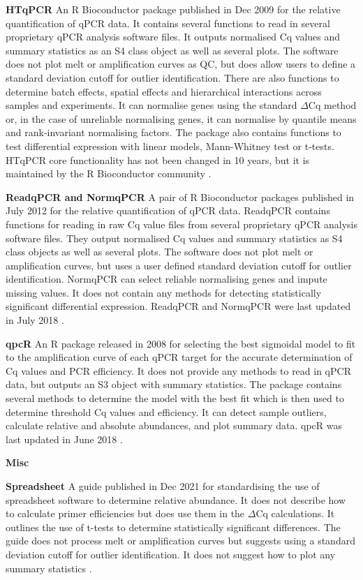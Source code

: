 \documentclass[../main.tex]{subfiles}
\begin{document}
\textbf{HTqPCR} An R Bioconductor package published in Dec 2009 for the relative quantification of qPCR data. 
It contains several functions to read in several proprietary qPCR analysis software files. 
It outputs normalised Cq values and summary statistics as an S4 class object as well as several plots. 
The software does not plot melt or amplification curves as QC, but does allow users to define a standard deviation cutoff for outlier identification. 
There are also functions to determine batch effects, spatial effects and hierarchical interactions across samples and experiments. 
It can normalise genes using the standard $\Delta$Cq method or, in the case of unreliable normalising genes, it can normalise by quantile means and rank-invariant normalising factors. 
The package also contains functions to test differential expression with linear models, Mann-Whitney test or t-tests. 
HTqPCR core functionality has not been changed in 10 years, but it is maintained by the R Bioconductor community \parencite{Dvinge2009}.

\textbf{ReadqPCR and NormqPCR} A pair of R Bioconductor packages published in July 2012 for the relative quantification of qPCR data. 
ReadqPCR contains functions for reading in raw Cq value files from several proprietary qPCR analysis software files. 
They output normalised Cq values and summary statistics as S4 class objects as well as several plots. 
The software does not plot melt or amplification curves, but uses a user defined standard deviation cutoff for outlier identification. 
NormqPCR can select reliable normalising genes and impute missing values. 
It does not contain any methods for detecting statistically significant differential expression. 
ReadqPCR and NormqPCR were last updated in July 2018 \parencite{Perkins2012}.

\textbf{qpcR} An R package released in 2008 for selecting the best sigmoidal model to fit to the amplification curve of each qPCR target for the accurate determination of Cq values and PCR efficiency. 
It does not provide any methods to read in qPCR data, but outputs an S3 object with summary statistics. 
The package contains several methods to determine the model with the best fit which is then used to determine threshold Cq values and efficiency. 
It can detect sample outliers, calculate relative and absolute abundances, and plot summary data. qpcR was last updated in June 2018 \parencite{Ritz2008}.

\textbf{Misc}

\textbf{Spreadsheet} A guide published in Dec 2021 for standardising the use of spreadsheet software to determine relative abundance. 
It does not describe how to calculate primer efficiencies but does use them in the $\Delta$Cq calculations. 
It outlines the use of t-tests to determine statistically significant differences.  
The guide does not process melt or amplification curves but suggests using a standard deviation cutoff for outlier identification. 
It does not suggest how to plot any summary statistics \parencite{Ng2021}.
\end{document}
